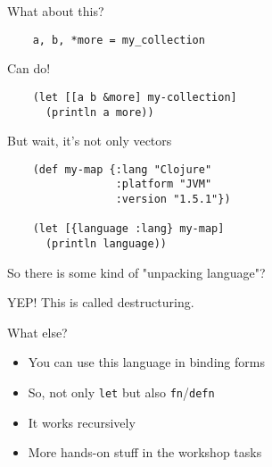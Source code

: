 \begin{frame}[fragile]
  \begin{center}
    What about this?
  \end{center}
  \begin{verbatim}
    a, b, *more = my_collection
  \end{verbatim}
\end{frame}

\begin{frame}[fragile]
  \begin{center}
    Can do!
  \end{center}
  \begin{verbatim}
    (let [[a b &more] my-collection]
      (println a more))
  \end{verbatim}
\end{frame}

\begin{frame}[fragile]
  \begin{center}
    But wait, it's not only vectors
  \end{center}
  \begin{verbatim}
    (def my-map {:lang "Clojure"
                 :platform "JVM"
                 :version "1.5.1"})

    (let [{language :lang} my-map]
      (println language))
  \end{verbatim}
\end{frame}

\begin{frame}
  \begin{center}
    So there is some kind of "unpacking language"?

    \pause
    YEP! This is called destructuring.
  \end{center}
\end{frame}

\begin{frame}
  What else?

  \begin{itemize}
    \item You can use this language in binding forms
    \item So, not only \texttt{let} but also \texttt{fn}/\texttt{defn}
    \item It works recursively
    \item More hands-on stuff in the workshop tasks
  \end{itemize}
\end{frame}


